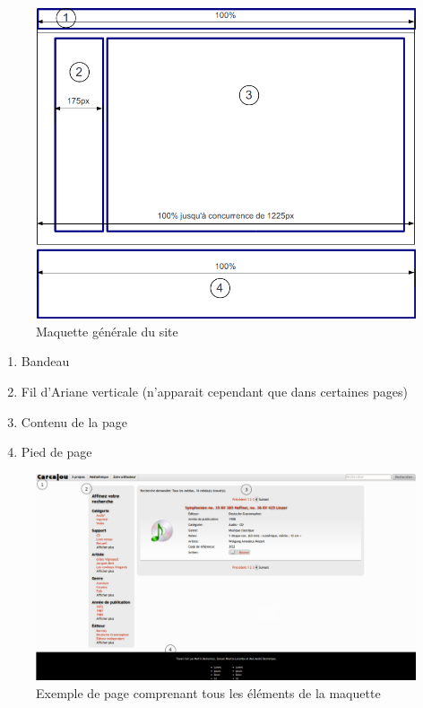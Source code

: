 \documentclass[letter, 11pt]{report}
\begin{document}
\begin{figure}[htbp]
	\begin{center}
		\includegraphics[scale=0.6]{maquetteImage.png}
	\end{center}
	\caption{Maquette générale du site}
\end{figure}

\begin{enumerate}
	\item Bandeau
	\item Fil d'Ariane verticale (n'apparait cependant que dans certaines pages)
	\item Contenu de la page
	\item Pied de page
\end{enumerate}

\begin{figure}[htbp]
	\begin{center}
		\includegraphics[scale=0.3]{pageType.png}
	\end{center}
	\caption{Exemple de page comprenant tous les éléments de la maquette}
\end{figure}
\end{document}
